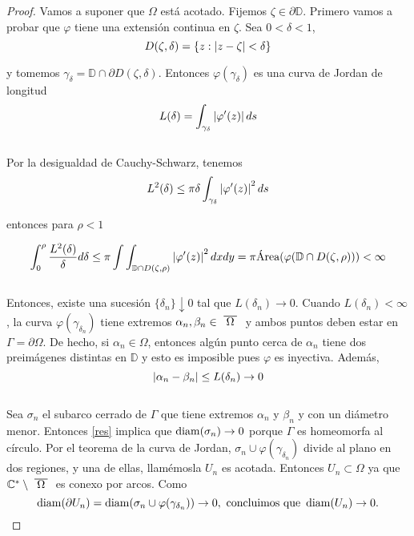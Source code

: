 \begin{proof}
    Vamos a suponer que $\Omega$ está acotado. Fijemos $\zeta \in \partial \mathbb{D}$. Primero vamos a probar que $\varphi$ tiene una extensión continua en $\zeta$. Sea $0 < \delta < 1$,
    \begin{equation*}
        D(\zeta, \delta) = \{z: \left\lvert z - \zeta\right\rvert < \delta \}
    \end{equation*}

    y tomemos $\gamma_{\delta} = \mathbb{D} \cap \partial D(\zeta, \delta)$. Entonces $\varphi (\gamma_{\delta})$ es una curva de Jordan de longitud
    \begin{equation*}
        L(\delta) = \int_{\gamma_{\delta}} \left\lvert\varphi ' (z)\right\rvert ds
    \end{equation*}
    \\
    Por la desigualdad de Cauchy-Schwarz, tenemos
    \begin{equation*}
        L^2(\delta) \leq \pi \delta \int_{\gamma_{\delta}} \left\lvert\varphi ' (z)\right\rvert^2 ds
    \end{equation*}

    entonces para $\rho < 1$

    \begin{equation*}
        \int_{0}^{\rho} \frac{L^2(\delta)}{\delta} d\delta \leq \pi \int \int_{\mathbb{D} \cap D(\zeta, \rho)} \left\lvert\varphi ' (z)\right\rvert^2 dxdy = \pi \text{Área}(\varphi(\mathbb{D} \cap D(\zeta, \rho))) < \infty
    \end{equation*}
    \\
    Entonces, existe una sucesión $\{ \delta_n\} \downarrow 0$ tal que $L(\delta_n) \rightarrow 0$. Cuando $L(\delta_n) < \infty$, la curva $\varphi(\gamma_{\delta_n})$ tiene extremos $\alpha_n, \beta_n \in \xbar{\Omega}$ y ambos puntos deben estar en $\Gamma = \partial \Omega$. De hecho, si $\alpha_n \in \Omega$, entonces algún punto cerca de $\alpha_n$ tiene dos preimágenes distintas en $\mathbb{D}$ y esto es imposible pues $\varphi$ es inyectiva. Además,
    \begin{equation}\label{res}
        \left\lvert\alpha_n - \beta_n\right\rvert \leq L(\delta_n) \rightarrow 0
    \end{equation}
    \\
    Sea $\sigma_n$ el subarco cerrado de $\Gamma$ que tiene extremos $\alpha_n$ y $\beta_n$ y con un diámetro menor. Entonces \ref{res} implica que $\operatorname{diam}(\sigma_n) \rightarrow 0$ porque $\Gamma$ es homeomorfa al círculo. Por el teorema de la curva de Jordan, $\sigma_n \cup \varphi(\gamma_{\delta_n})$ divide al plano en dos regiones, y una de ellas, llamémosla $U_n$ es acotada. Entonces $U_n \subset \Omega$ ya que $\mathbb{C}^* \setminus \xbar{\Omega}$ es conexo por arcos. Como
    \begin{equation}
        \label{res2}
        \operatorname{diam}(\partial U_n) = \operatorname{diam}(\sigma_n \cup \varphi(\gamma_{\delta_n})) \rightarrow 0,
        \text{ concluimos que }
        \operatorname{diam}(U_n) \rightarrow 0.
    \end{equation}


\end{proof}
